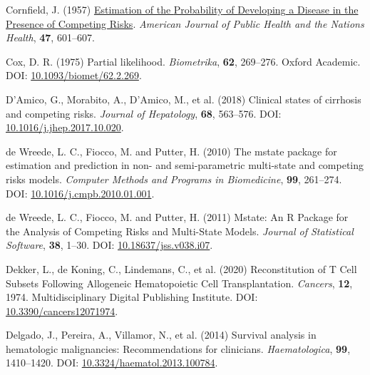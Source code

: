 \documentclass[
  letterpaper,
  DIV=11,
  numbers=noendperiod]{scrreprt}
\newlength{\cslhangindent}
\newlength{\cslentryspacingunit} %
\newenvironment{CSLReferences}[2] %
 {%
  \setlength{\parindent}{0pt}
  \ifodd #1
  \let\oldpar\par
  \def\par{\hangindent=\cslhangindent\oldpar}
  \fi
  \setlength{\parskip}{#2\cslentryspacingunit}
 }%
 {}
\begin{document}
\begin{CSLReferences}{1}{0}
\leavevmode{}%
Cornfield, J. (1957)
\href{https://www.ncbi.nlm.nih.gov/pmc/articles/PMC1551242}{Estimation
of the {Probability} of {Developing} a {Disease} in the {Presence} of
{Competing Risks}}. \emph{American Journal of Public Health and the
Nations Health}, \textbf{47}, 601--607.

\leavevmode{}%
Cox, D. R. (1975) Partial likelihood. \emph{Biometrika}, \textbf{62},
269--276. Oxford Academic. DOI:
\href{https://doi.org/10.1093/biomet/62.2.269}{10.1093/biomet/62.2.269}.

\leavevmode{}%
D'Amico, G., Morabito, A., D'Amico, M., et al. (2018) Clinical states of
cirrhosis and competing risks. \emph{Journal of Hepatology},
\textbf{68}, 563--576. DOI:
\href{https://doi.org/10.1016/j.jhep.2017.10.020}{10.1016/j.jhep.2017.10.020}.

\leavevmode{}%
de Wreede, L. C., Fiocco, M. and Putter, H. (2010) The mstate package
for estimation and prediction in non- and semi-parametric multi-state
and competing risks models. \emph{Computer Methods and Programs in
Biomedicine}, \textbf{99}, 261--274. DOI:
\href{https://doi.org/10.1016/j.cmpb.2010.01.001}{10.1016/j.cmpb.2010.01.001}.

\leavevmode{}%
de Wreede, L. C., Fiocco, M. and Putter, H. (2011) Mstate: {An R
Package} for the {Analysis} of {Competing Risks} and {Multi-State
Models}. \emph{Journal of Statistical Software}, \textbf{38}, 1--30.
DOI:
\href{https://doi.org/10.18637/jss.v038.i07}{10.18637/jss.v038.i07}.

\leavevmode{}%
Dekker, L., de Koning, C., Lindemans, C., et al. (2020) Reconstitution
of {T Cell Subsets Following Allogeneic Hematopoietic Cell
Transplantation}. \emph{Cancers}, \textbf{12}, 1974. Multidisciplinary
Digital Publishing Institute. DOI:
\href{https://doi.org/10.3390/cancers12071974}{10.3390/cancers12071974}.

\leavevmode{}%
Delgado, J., Pereira, A., Villamor, N., et al. (2014) Survival analysis
in hematologic malignancies: Recommendations for clinicians.
\emph{Haematologica}, \textbf{99}, 1410--1420. DOI:
\href{https://doi.org/10.3324/haematol.2013.100784}{10.3324/haematol.2013.100784}.


\end{CSLReferences}
\end{document}
